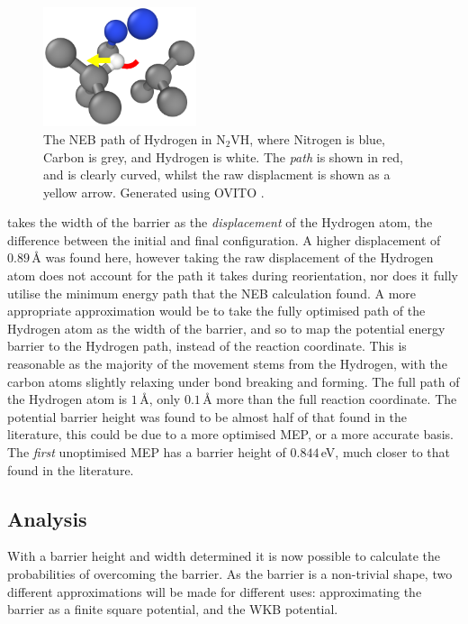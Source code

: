 \documentclass[10pt,a4paper,twocolumn,twoside]{extarticle}
\newcommand{\ntvh}{N$_2$VH}
\begin{document}
\begin{figure}
	\includegraphics[width=0.4\textwidth]{n2vh.png}
	\caption{The NEB path of Hydrogen in \ntvh, where Nitrogen is blue, Carbon is grey, and Hydrogen is white. The \emph{path} is shown in red, and is clearly curved, whilst the raw displacment is shown as a yellow arrow. Generated using OVITO \cite{OVITO}.}
	\label{fig:n2vh}
\end{figure}

\textcite{Peaker} takes the width of the barrier as the \emph{displacement} of the Hydrogen atom, the difference between the initial and final configuration. A higher displacement of $0.89$\,{\AA} was found here, however taking the raw displacement of the Hydrogen atom does not account for the path it takes during reorientation, nor does it fully utilise the minimum energy path that the NEB calculation found. A more appropriate approximation would be to take the fully optimised path of the Hydrogen atom as the width of the barrier, and so to map the potential energy barrier to the Hydrogen path, instead of the reaction coordinate. This is reasonable as the majority of the movement stems from the Hydrogen, with the carbon atoms slightly relaxing under bond breaking and forming. The full path of the Hydrogen atom is $1$\,{\AA}, only $0.1$\,{\AA} more than the full reaction coordinate. The potential barrier height was found to be almost half of that found in the literature, this could be due to a more optimised MEP, or a more accurate basis. The \emph{first} unoptimised MEP has a barrier height of $0.844$\,eV, much closer to that found in the literature. 
\subsection{Analysis}
With a barrier height and width determined it is now possible to calculate the probabilities of overcoming the barrier. As the barrier is a non-trivial shape, two different approximations will be made for different uses: approximating the barrier as a finite square potential, and the WKB potential. 
\end{document}
